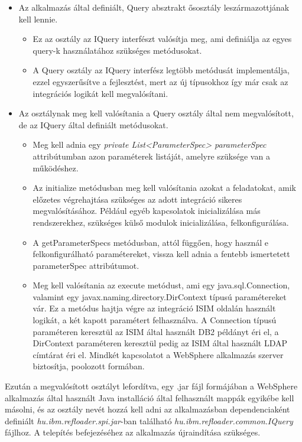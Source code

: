 \begin{itemize}
	\item Az alkalmazás által definiált, Query absztrakt ősosztály leszármazottjának kell lennie.
	\begin{itemize}
		\item Ez az osztály az IQuery interfészt valósítja meg, ami definiálja az egyes query-k használatához szükséges metódusokat.
		\item A Query osztály az IQuery interfész legtöbb metódusát implementálja, ezzel egyszerűsítve a fejlesztést, mert az új típusokhoz így már csak az integrációs logikát kell megvalósítani.
		
	\end{itemize}
	\item Az osztálynak meg kell valósítania a Query osztály által nem megvalósított, de az IQuery által definiált metódusokat.
	\begin{itemize}
		\item Meg kell adnia egy \textit{private List<ParameterSpec> parameterSpec} attribútumban azon paraméterek listáját, amelyre szüksége van a működéshez.
		\item Az initialize metódusban meg kell valósítania azokat a feladatokat, amik előzetes végrehajtása szükséges az adott integráció sikeres megvalósításához. Például egyéb kapcsolatok inicializálása más rendszerekhez, szükséges külső modulok inicializálása, felkonfigurálása.
		\item A getParameterSpecs metódusban, attól függően, hogy használ e felkonfigurálható paramétereket, vissza kell adnia a fentebb ismertetett parameterSpec attribútumot.
		\item Meg kell valósítania az execute metódust, ami egy java.sql.Connection, valamint egy javax.naming.directory.DirContext típusú paramétereket vár. Ez a metódus hajtja végre az integráció ISIM oldalán használt logikát, a két kapott paramétert felhasználva. A Connection típusú paraméteren keresztül az ISIM által használt DB2 példányt éri el, a DirContext paraméteren keresztül pedig az ISIM által használt LDAP címtárat éri el. Mindkét kapcsolatot a WebSphere alkalmazás szerver biztosítja, poolozott formában.
	\end{itemize}
\end{itemize} 

Ezután a megvalósított osztályt lefordítva, egy .jar fájl formájában a WebSphere alkalmazás által használt Java installáció által felhasznált mappák egyikébe kell másolni, és az osztály nevét hozzá kell adni az alkalmazásban dependenciaként definiált \emph{hu.ibm.refloader.spi.jar}-ban található \emph{hu.ibm.refloader.common.IQuery} fájlhoz. A telepítés befejezéséhez az alkalmazás újraindítása szükséges.

